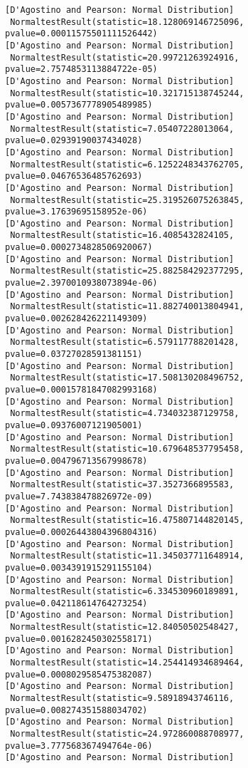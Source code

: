 \documentclass[11pt]{article}
\begin{document}
\begin{Verbatim}[commandchars=\\\{\}]
[D'Agostino and Pearson: Normal Distribution]
 NormaltestResult(statistic=18.128069146725096, pvalue=0.00011575501111526442)
[D'Agostino and Pearson: Normal Distribution]
 NormaltestResult(statistic=20.99721263924916, pvalue=2.7574853113884722e-05)
[D'Agostino and Pearson: Normal Distribution]
 NormaltestResult(statistic=10.321715138745244, pvalue=0.0057367778905489985)
[D'Agostino and Pearson: Normal Distribution]
 NormaltestResult(statistic=7.05407228013064, pvalue=0.02939190037434028)
[D'Agostino and Pearson: Normal Distribution]
 NormaltestResult(statistic=6.1252248343762705, pvalue=0.04676536485762693)
[D'Agostino and Pearson: Normal Distribution]
 NormaltestResult(statistic=25.319526075263845, pvalue=3.17639695158952e-06)
[D'Agostino and Pearson: Normal Distribution]
 NormaltestResult(statistic=16.4085432824105, pvalue=0.0002734828506920067)
[D'Agostino and Pearson: Normal Distribution]
 NormaltestResult(statistic=25.882584292377295, pvalue=2.3970010938073894e-06)
[D'Agostino and Pearson: Normal Distribution]
 NormaltestResult(statistic=11.882740013804941, pvalue=0.002628426221149309)
[D'Agostino and Pearson: Normal Distribution]
 NormaltestResult(statistic=6.579117788201428, pvalue=0.03727028591381151)
[D'Agostino and Pearson: Normal Distribution]
 NormaltestResult(statistic=17.508130208496752, pvalue=0.00015781847082993168)
[D'Agostino and Pearson: Normal Distribution]
 NormaltestResult(statistic=4.734032387129758, pvalue=0.09376007121905001)
[D'Agostino and Pearson: Normal Distribution]
 NormaltestResult(statistic=10.679648537795458, pvalue=0.004796713567998678)
[D'Agostino and Pearson: Normal Distribution]
 NormaltestResult(statistic=37.3527366895583, pvalue=7.743838478826972e-09)
[D'Agostino and Pearson: Normal Distribution]
 NormaltestResult(statistic=16.475807144820145, pvalue=0.00026443804396804316)
[D'Agostino and Pearson: Normal Distribution]
 NormaltestResult(statistic=11.345037711648914, pvalue=0.0034391915291155104)
[D'Agostino and Pearson: Normal Distribution]
 NormaltestResult(statistic=6.334530960189891, pvalue=0.042118614764273254)
[D'Agostino and Pearson: Normal Distribution]
 NormaltestResult(statistic=12.84050502548427, pvalue=0.0016282450302558171)
[D'Agostino and Pearson: Normal Distribution]
 NormaltestResult(statistic=14.254414934689464, pvalue=0.0008029585475382087)
[D'Agostino and Pearson: Normal Distribution]
 NormaltestResult(statistic=9.58918943746116, pvalue=0.008274351588034702)
[D'Agostino and Pearson: Normal Distribution]
 NormaltestResult(statistic=24.972860088708977, pvalue=3.777568367494764e-06)
[D'Agostino and Pearson: Normal Distribution]

\end{Verbatim}
\end{document}
